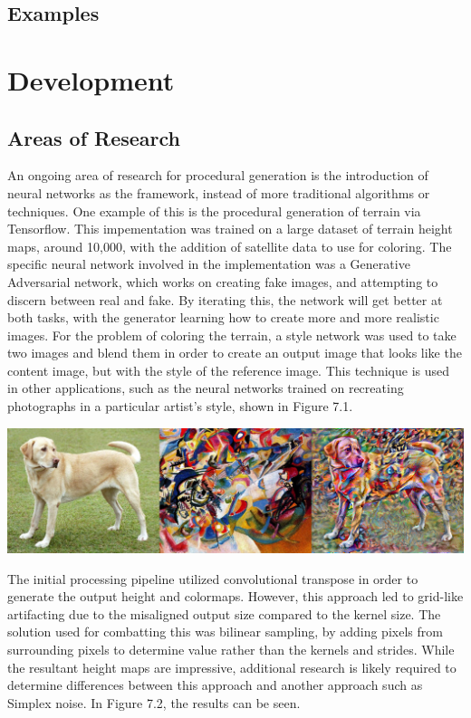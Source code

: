 \documentclass[10pt]{report}
\begin{document}
		\section{Examples}
	
	\vspace{10pt}
	\let\clearpage\relax
	\chapter{Development}

		\section{Areas of Research}
	
		An ongoing area of research for procedural generation is the introduction of neural networks as the framework, instead of more traditional algorithms or techniques. One example of this is the procedural generation of terrain via Tensorflow. This impementation was trained on a large dataset of terrain height maps, around 10,000, with the addition of satellite data to use for coloring. The specific neural network involved in the implementation was a Generative Adversarial network, which works on creating fake images, and attempting to discern between real and fake. By iterating this, the network will get better at both tasks, with the generator learning how to create more and more realistic images. For the problem of coloring the terrain, a style network was used to take two images and blend them in order to create an output image that looks like the content image, but with the style of the reference image. This technique is used in other applications, such as the neural networks trained on recreating photographs in a particular artist's style, shown in Figure 7.1. 
		
		\begin{minipage}{\textwidth}
			\centering
			\includegraphics[scale=.3]{stylized-image}
			\label{fig:fig7}
		\end{minipage}
	
		The initial processing pipeline utilized convolutional transpose in order to generate the output height and colormaps. However, this approach led to grid-like artifacting due to the misaligned output size compared to the kernel size. The solution used for combatting this was bilinear sampling, by adding pixels from surrounding pixels to determine value rather than the kernels and strides. While the resultant height maps are impressive, additional research is likely required to determine differences between this approach and another approach such as Simplex noise. In Figure 7.2, the results can be seen. 
		
\end{document}
